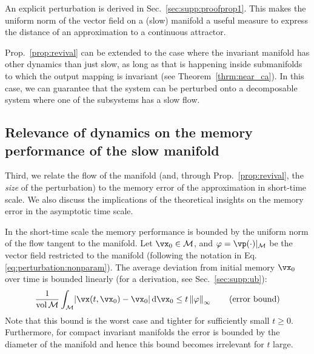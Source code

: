 \documentclass{article} %
\newcounter{ct}
\newcommand{\dm}[1]{\ensuremath{\mathrm{d}{#1}}} %
\newcommand{\manifold}{\mathcal{M}}
\newcommand{\uniformNorm}[1]{\left\|#1\right\|_\infty} %
\DeclarePairedDelimiter{\abs}{\lvert}{\rvert}
\theoremstyle{definition}
\theoremstyle{remark}
\begin{document}
An explicit perturbation is derived in Sec.~\ref{sec:supp:proofprop1}.
This makes the uniform norm of the vector field on a (slow) manifold a useful measure to express the distance of an approximation to a continuous attractor.


Prop.~\ref{prop:revival}  can be extended to the case where the invariant manifold has other dynamics than just slow, as long as that is happening inside submanifolds to which the output mapping is invariant (see Theorem~\ref{thrm:near_ca}).
In this case, we can guarantee that the system can be perturbed onto a decomposable system where one of the subsystems has a slow flow.

\subsection{Relevance of dynamics on the memory performance of the slow manifold}\label{sec:attractor_bif}

Third, we relate the flow of the manifold (and, through Prop.~\ref{prop:revival}, the \emph{size} of the perturbation) to the memory error of the approximation in short-time scale.
We also discuss the implications of the theoretical insights on the memory error in the asymptotic time scale.

In the short-time scale the memory performance is bounded by the uniform norm of the flow tangent to the manifold.
Let \(\vx_{0} \in \manifold\), and \(\varphi = \vp(\cdot)\vert_{\manifold}\) be the vector field restricted to the manifold (following the notation in Eq.\ref{eq:perturbation:nonparam}).
The average deviation from initial memory \(\vx_{0}\) over time is bounded linearly (for a derivation, see Sec.~\ref{sec:supp:ub}):
\begin{align}\label{eq:distance:ub}
\frac{1}{\operatorname{vol}\manifold}\int_{\manifold}
\abs{\vx(t, \vx_{0}) - \vx_{0}}\,
\dm{\vx_{0}}
\leq t\uniformNorm{\varphi}
\qquad
\text{(error bound)}
\end{align}
Note that this bound is the worst case and tighter for sufficiently small \(t \geq 0\).
Furthermore, for compact invariant manifolds the error is bounded by the diameter of the manifold and hence this bound becomes irrelevant for \(t\) large.
\end{document}
